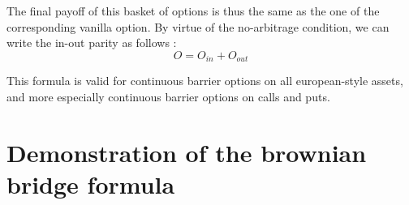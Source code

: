 \documentclass[a4paper,11pt,english]{book}
\begin{document}
The final payoff of this basket of options is thus the same as the one of the corresponding vanilla option. By virtue of the no-arbitrage condition, we can write the in-out parity as follows : 
$$O = O_{in} + O_{out}$$

This formula is valid for continuous barrier options on all european-style assets, and more especially continuous barrier options on calls and puts.

\section{Demonstration of the brownian bridge formula}
\label{appendix:brownian-bridge}



\endgroup
\end{document}
